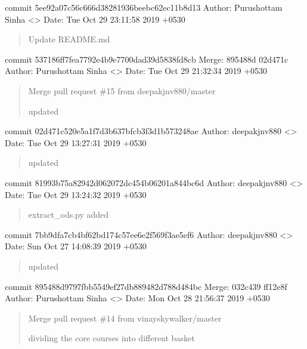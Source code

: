 \documentclass[letterpaper,10pt,english]{sphinxmanual}
\begin{document}
commit 5ee92a07c56c666d38281936beebc62ec11b8d13
Author: Purushottam Sinha \textless{}\textgreater{}
Date:   Tue Oct 29 23:11:58 2019 +0530
\begin{quote}

Update README.md
\end{quote}

commit 537186ff7fea7792e4b9e7700dad39d5838fd8cb
Merge: 895488d 02d471c
Author: Purushottam Sinha \textless{}\textgreater{}
Date:   Tue Oct 29 21:32:34 2019 +0530
\begin{quote}

Merge pull request \#15 from deepakjnv880/master

updated
\end{quote}

commit 02d471c520e5a1f7d3b637bfcb3f3d1b573248ae
Author: deepakjnv880 \textless{}\textgreater{}
Date:   Tue Oct 29 13:27:31 2019 +0530
\begin{quote}

updated
\end{quote}

commit 81993b75a82942d062072dc454b06201a844bc6d
Author: deepakjnv880 \textless{}\textgreater{}
Date:   Tue Oct 29 13:24:32 2019 +0530
\begin{quote}

extract\_ods.py added
\end{quote}

commit 7bb9dfa7cb4bf62bd174c57ee6e2f569f3ae5ef6
Author: deepakjnv880 \textless{}\textgreater{}
Date:   Sun Oct 27 14:08:39 2019 +0530
\begin{quote}

updated
\end{quote}

commit 895488d9797fbb5549ef27db889482d788d484bc
Merge: 032c439 ff12e8f
Author: Purushottam Sinha \textless{}\textgreater{}
Date:   Mon Oct 28 21:56:37 2019 +0530
\begin{quote}

Merge pull request \#14 from vinayskywalker/master

dividing the core courses into different basket
\end{quote}
\end{document}
